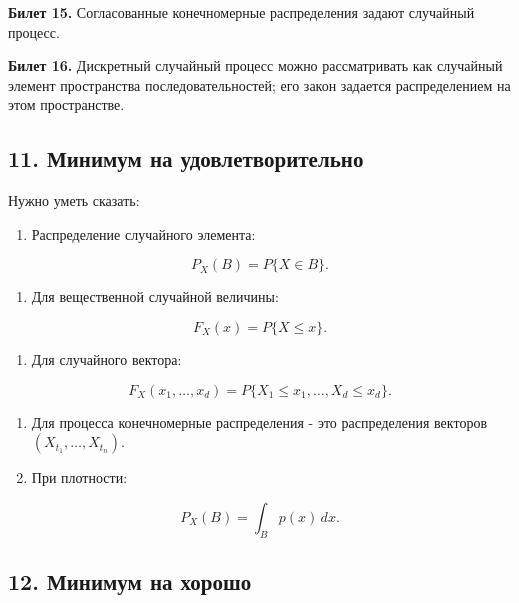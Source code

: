 \documentclass[
  11pt,
  a4paper,
]{article}
\providecommand{\tightlist}{%
  \setlength{\itemsep}{0pt}\setlength{\parskip}{0pt}}
\begin{document}
\textbf{Билет 15.} Согласованные конечномерные распределения задают
случайный процесс.

\textbf{Билет 16.} Дискретный случайный процесс можно рассматривать как
случайный элемент пространства последовательностей; его закон задается
распределением на этом пространстве.

\subsection{11. Минимум на
удовлетворительно}\label{ux43cux438ux43dux438ux43cux443ux43c-ux43dux430-ux443ux434ux43eux432ux43bux435ux442ux432ux43eux440ux438ux442ux435ux43bux44cux43dux43e}

Нужно уметь сказать:

\begin{enumerate}
\def\labelenumi{\arabic{enumi}.}
\tightlist
\item
  Распределение случайного элемента:
\end{enumerate}

\[
P_X(B)=P\{X\in B\}.
\]

\begin{enumerate}
\def\labelenumi{\arabic{enumi}.}
\setcounter{enumi}{1}
\tightlist
\item
  Для вещественной случайной величины:
\end{enumerate}

\[
F_X(x)=P\{X\le x\}.
\]

\begin{enumerate}
\def\labelenumi{\arabic{enumi}.}
\setcounter{enumi}{2}
\tightlist
\item
  Для случайного вектора:
\end{enumerate}

\[
F_X(x_1,\ldots,x_d)
=
P\{X_1\le x_1,\ldots,X_d\le x_d\}.
\]

\begin{enumerate}
\def\labelenumi{\arabic{enumi}.}
\setcounter{enumi}{3}
\item
  Для процесса конечномерные распределения - это распределения векторов
  \((X_{t_1},\ldots,X_{t_n})\).
\item
  При плотности:
\end{enumerate}

\[
P_X(B)=\int_Bp(x)\,dx.
\]

\subsection{12. Минимум на
хорошо}\label{ux43cux438ux43dux438ux43cux443ux43c-ux43dux430-ux445ux43eux440ux43eux448ux43e}
\end{document}
